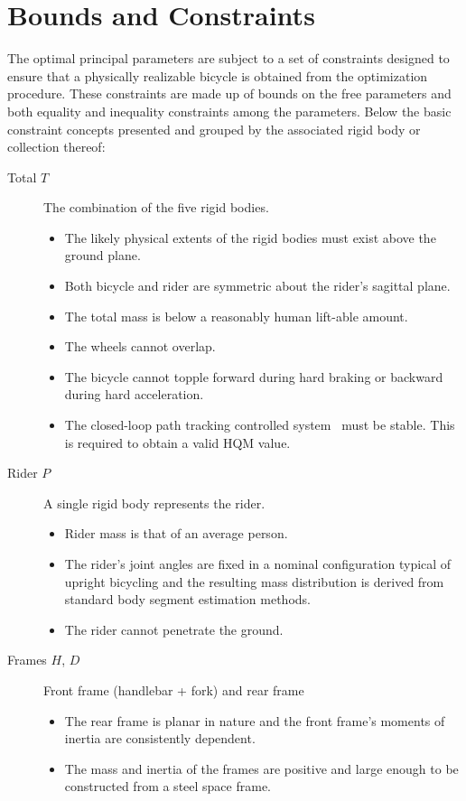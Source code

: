 \documentclass{bmd2019a}
\begin{document}
\section{Bounds and Constraints}
%
The optimal principal parameters are subject to a set of constraints designed
to ensure that a physically realizable bicycle is obtained from the
optimization procedure. These constraints are made up of bounds on the free
parameters and both equality and inequality constraints among the parameters.
Below the basic constraint concepts presented and grouped by the associated
rigid body or collection thereof:
%
\begin{description}
  \item[Total $T$] The combination of the five rigid bodies.
    \begin{itemize}
      \item The likely physical extents of the rigid bodies must exist above
        the ground plane.
      \item Both bicycle and rider are symmetric about the rider's sagittal
        plane.
      \item The total mass is below a reasonably human lift-able amount.
      \item The wheels cannot overlap.
      \item The bicycle cannot topple forward during hard braking or backward
        during hard acceleration.
      \item The closed-loop path tracking controlled system~\cite{Hess2012}
        must be stable. This is required to obtain a valid HQM value.
    \end{itemize}

  \item[Rider $P$] A single rigid body represents the rider.
    \begin{itemize}
      \item Rider mass is that of an average person.
      \item The rider's joint angles are fixed in a nominal configuration
        typical of upright bicycling and the resulting mass distribution is
        derived from standard body segment estimation methods.
      \item The rider cannot penetrate the ground.
    \end{itemize}

  \item[Frames $H$, $D$] Front frame (handlebar + fork) and rear frame
    \begin{itemize}
      \item The rear frame is planar in nature and the front frame's moments of
        inertia are consistently dependent.
      \item The mass and inertia of the frames are positive and large enough to
        be constructed from a steel space frame.
    \end{itemize}


\end{description}
\end{document}
